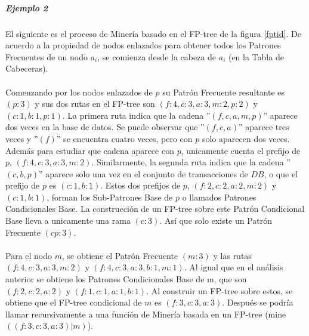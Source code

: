 \subparagraph{Ejemplo 2}
El siguiente es el proceso de Miner\'ia basado en el FP-tree de la figura \ref{fptid}. De acuerdo a la propiedad
de nodos enlazados para obtener todos los Patrones Frecuentes de un nodo $a_{i}$, se comienza desde la cabeza de
$a_{i}$ (en la Tabla de Cabeceras).\\ \\
Comenzando por los nodos enlazados de $p$ su Patr\'on Frecuente resultante es $(p:3)$ y sus dos rutas en el
FP-tree son $(f:4,c:3,a:3,m:2,p:2)$ y $(c:1,b:1,p:1)$. La primera ruta indica que la cadena ''$(f,c,a,m,p)$''
aparece dos veces en la base de datos. Se puede observar que ''$(f,c,a)$'' aparece tres veces y ''$(f)$'' se
encuentra cuatro veces, pero con $p$ solo aparecen dos veces. Adem\'as para estudiar que cadena aparece con $p$,
unicamente cuenta el prefijo de $p$, $(f:4,c:3,a:3,m:2)$. Similarmente, la segunda ruta indica que la cadena
''$(c,b,p)$'' aparece solo una vez en el conjunto de transacciones de $DB$, o que el prefijo de $p$ es
$(c:1,b:1)$. Estos dos prefijos de $p$, $(f:2,c:2,a:2,m:2)$ y $(c:1,b:1)$, forman los Sub-Patrones Base de $p$ o
llamados Patrones Condicionales Base. La construcci\'on de un FP-tree sobre este Patr\'on Condicional Base lleva
a unicamente una rama $(c:3)$. As\'i que solo existe un Patr\'on Frecuente $(cp:3)$.\\ \\
Para el nodo $m$, se obtiene el Patr\'on Frecuente $(m:3)$ y las rutas $(f:4,c:3,a:3,m:2)$ y
$(f:4,c:3,a:3,b:1,m:1)$. Al igual que en el an\'alisis anterior se obtiene los Patrones Condicionales Base de m,
que son $(f:2,c:2,a:2)$ y $(f:1,c:1,a:1,b:1)$. Al construir un FP-tree sobre estos, se obtiene que el FP-tree
condicional de $m$ es $(f:3,c:3,a:3)$. Despu\'es se podr\'ia llamar recursivamente a una funci\'on de Miner\'ia
basada en un FP-tree (mine$((f:3,c:3,a:3)|m)$).\\

